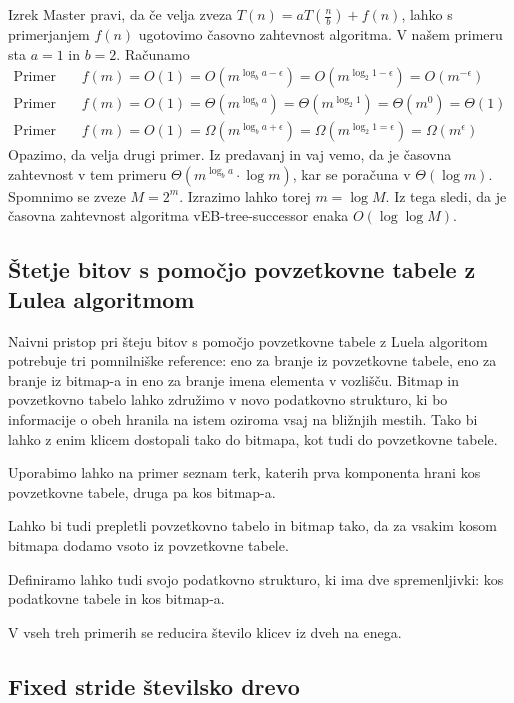 \documentclass{article}
\begin{document}
Izrek Master pravi, da če velja zveza $T(n) = a T(\frac{n}{b}) + f(n)$, lahko s primerjanjem $f(n)$ ugotovimo časovno zahtevnost algoritma.
V našem primeru sta $a = 1$ in $b = 2$. Računamo
\begin{align*}
    \text{Primer 1: }& f(m) = O(1) = O(m^{\log_b a - \epsilon}) = O(m^{\log_2 1 - \epsilon}) = O(m^{- \epsilon}) \\
    \text{Primer 2: }& f(m) = O(1) = \Theta(m^{\log_b a}) = \Theta(m^{\log_2 1}) = \Theta(m^0) = \Theta(1) \\
    \text{Primer 3: }& f(m) = O(1) = \Omega(m^{\log_b a + \epsilon}) = \Omega(m^{\log_2 1 = \epsilon}) = \Omega(m^{\epsilon})
\end{align*}
Opazimo, da velja drugi primer. Iz predavanj in vaj vemo, da je časovna zahtevnost v tem primeru $\Theta(m^{\log_b a} \cdot \log m)$, kar se poračuna v $\Theta (\log m)$. Spomnimo se zveze $M = 2^m$. Izrazimo lahko torej $m = \log M$. Iz tega sledi, da je časovna zahtevnost algoritma vEB-tree-successor enaka $O(\log \log M)$.

\subsection*{Štetje bitov s pomočjo povzetkovne tabele z Lulea algoritmom}

Naivni pristop pri šteju bitov s pomočjo povzetkovne tabele z Luela algoritom potrebuje tri pomnilniške reference: eno za branje iz povzetkovne tabele, eno za branje iz bitmap-a in eno za branje imena elementa v vozlišču.
Bitmap in povzetkovno tabelo lahko združimo v novo podatkovno strukturo, ki bo informacije o obeh hranila na istem oziroma vsaj na bližnjih mestih.
Tako bi lahko z enim klicem dostopali tako do bitmapa, kot tudi do povzetkovne tabele.

Uporabimo lahko na primer seznam terk, katerih prva komponenta hrani kos povzetkovne tabele, druga pa kos bitmap-a. 

Lahko bi tudi prepletli povzetkovno tabelo in bitmap tako, da za vsakim kosom bitmapa dodamo vsoto iz povzetkovne tabele.

Definiramo lahko tudi svojo podatkovno strukturo, ki ima dve spremenljivki: kos podatkovne tabele in kos bitmap-a.

V vseh treh primerih se reducira število klicev iz dveh na enega.

\subsection*{Fixed stride številsko drevo}
\end{document}
